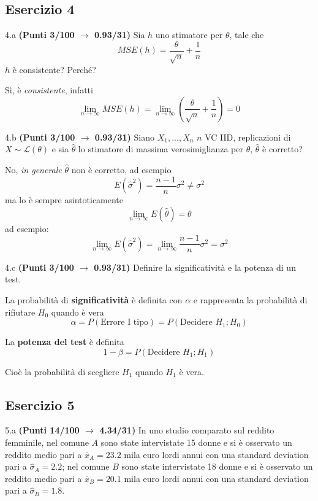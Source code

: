 \documentclass[
  11pt,
]{book}
\theoremstyle{mytheoremstyle}
\theoremstyle{mydefstyle}
\newenvironment{sol}
  {
  \begin{tcolorbox}[enhanced,breakable,arc=0.1mm,boxrule=1pt,colback=white,colframe=iblue,
  title=\bf \fontfamily{lmss}\selectfont \hspace{.5 cm} Soluzione,drop fuzzy shadow]

}{
\end{tcolorbox}
  }
\begin{document}
\subsection{Esercizio 4}\label{esercizio-4-3}

4.a \textbf{(Punti 3/100 \(\rightarrow\) 0.93/31)} Sia \(h\) uno stimatore per \(\theta\), tale che
\[
MSE(h)=\frac\theta {\sqrt{ n}}+\frac1n
\]
\(h\) è consistente? Perché?

\begin{sol}
Sì, è \emph{consistente}, infatti
\[
\lim_{n\to\infty}MSE(h)=\lim_{n\to\infty}\left(\frac\theta {\sqrt{ n}}+\frac1n\right)=0
\]

\end{sol}

4.b \textbf{(Punti 3/100 \(\rightarrow\) 0.93/31)} Siano \(X_1,...,X_n\) \(n\) VC IID, replicazioni di \(X\sim \mathscr{L}(\theta)\) e sia \(\hat\theta\) lo stimatore di massima verosimiglianza per \(\theta\),
\(\hat\theta\) è corretto?

\begin{sol}
No, \emph{in generale} \(\hat\theta\) non è corretto, ad esempio
\[
E(\hat\sigma^2)=\frac{n-1}n\sigma^2\ne\sigma^2
\]
ma lo è sempre asintoticamente
\[
\lim_{n\to\infty}E(\hat\theta)=\theta
\]
ad esempio:
\[
\lim_{n\to\infty}E(\hat\sigma^2)=\lim_{n\to\infty}\frac{n-1}n\sigma^2=\sigma^2
\]

\end{sol}

4.c \textbf{(Punti 3/100 \(\rightarrow\) 0.93/31)} Definire la significatività e la potenza di un test.

\begin{sol}
La probabilità di \textbf{significatività} è definita con \(\alpha\) e rappresenta la probabilità di rifiutare \(H_0\) quando è vera
\[\alpha=P(\text{Errore I tipo})=P(\text{Decidere $H_1$};H_0)\]

La \textbf{potenza del test} è definita
\[1-\beta =P(\text{Decidere $H_1$}; H_1)\]

Cioè la probabilità di scegliere \(H_1\) quando \(H_1\) è vera.

\end{sol}

\subsection{Esercizio 5}\label{esercizio-5-2}

5.a \textbf{(Punti 14/100 \(\rightarrow\) 4.34/31)} In uno studio comparato sul reddito femminile, nel comune \(A\) sono state intervistate 15 donne e si è osservato un reddito medio pari a \(\bar x_A=23.2\) mila euro lordi annui con una standard deviation pari a \(\hat\sigma_A=2.2\); nel comune \(B\) sono state intervistate 18 donne e si è osservato un reddito medio pari a \(\bar x_B=20.1\) mila euro lordi annui con una standard deviation pari a \(\hat\sigma_B=1.8\).
\end{document}
